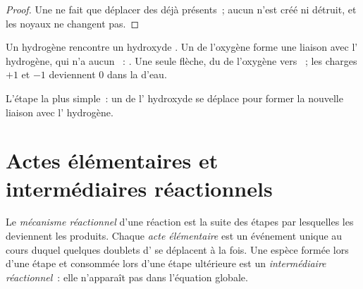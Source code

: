 \begin{proof}
Une  ne fait que déplacer des  déjà présents~;
aucun  n'est créé ni détruit, et les noyaux ne changent pas.
\end{proof}

\begin{example}\label{ex:g12:curly-arrows:first}
Un  hydrogène  rencontre un  hydroxyde . Un  de l'oxygène forme une liaison avec l' hydrogène, qui n'a
aucun ~:
. Une seule flèche, du  de
l'oxygène vers ~; les charges $+1$ et $-1$ deviennent 0 dans la
 d'eau.
\end{example}

\begin{omfigure}
\qquad\raisebox{0.2ex}{$+$}\qquad
{}
\qquad\raisebox{0.2ex}{$\longrightarrow$}\qquad
{}

{\small L'étape la plus simple~: un  de l'
hydroxyde se déplace pour former la nouvelle liaison  avec l'
hydrogène.}
\end{omfigure}

\section{Actes élémentaires et intermédiaires réactionnels}

\begin{definition}\label{def:g12:curly-arrows:mechanism}
Le \emph{mécanisme réactionnel} d'une
réaction est la suite des étapes par lesquelles les  deviennent
les produits. Chaque \emph{acte élémentaire} est
un événement unique au cours duquel quelques doublets d' se
déplacent à la fois. Une espèce formée lors d'une étape et consommée
lors d'une étape ultérieure est un \emph{intermédiaire
réactionnel}~:
elle n'apparaît pas dans l'équation globale.
\end{definition}


